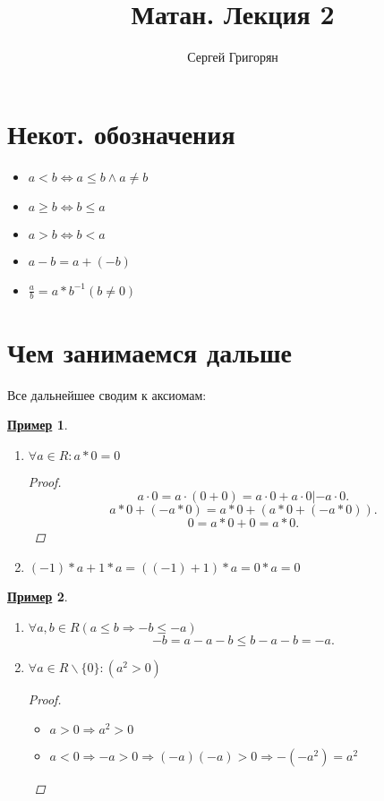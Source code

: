 \documentclass[12pt]{article}
\title{Матан. Лекция 2}
\author{Сергей Григорян}
\newtheorem*{example}{\underline{Пример}}
\theoremstyle{definition}
\theoremstyle{definition}
\begin{document}
\maketitle
\newpage
\section{Некот. обозначения}
\begin{itemize}
    \item $a < b \iff a \leq b  \land  a \neq b$
    \item $a \geq b \iff b \leq a$
    \item $a > b \iff b < a$
    \item $ a - b = a + (-b) $
    \item $\frac{a}{b} = a * b^{-1} (b\neq0)$
\end{itemize}

\section{Чем занимаемся дальше}
Все дальнейшее сводим к аксиомам:
\begin{example}
\begin{enumerate}
    \item $\forall a  \in R \colon a * 0 = 0$
        \begin{proof}
            \[
        a \cdot  0 = a \cdot (0 + 0) = a \cdot  0 + a \cdot  0     | -a\cdot  0
            .\] 
            \[
            a * 0 + (-a * 0) = a * 0 + (a * 0 + (-a * 0))
            .\] 
            \[
            0 = a * 0 + 0 = a * 0
            .\] 
        \end{proof}
    \item $(-1) * a + 1 * a = ((-1) + 1) * a = 0 * a = 0$
\end{enumerate}
\end{example}
\begin{example}
\begin{enumerate}
    \item $\forall a, b  \in R (a \leq b \Rightarrow -b \leq -a)$ 
        \[
        -b = a - a - b \leq b - a - b = -a
        .\] 
    \item $\forall a  \in  R \backslash \{0\} \colon  (a^{2} > 0)$ 
        \begin{proof}
        \begin{itemize}
            \item [a) ] $a > 0 \Rightarrow a^{2} > 0$
            \item [b) ] $a < 0 \Rightarrow -a > 0 \Rightarrow (-a)(-a) > 0 \Rightarrow -(-a^{2}) = a^{2}$
        \end{itemize}
        \end{proof}
        
\end{enumerate}
\end{example}
\end{document}
